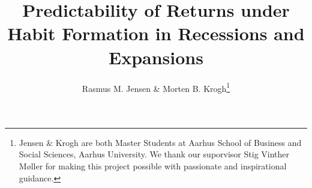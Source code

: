 

\usepackage{booktabs}



\onehalfspacing      %

\author{Rasmus M. Jensen \& Morten B. Krogh\thanks{\rm Jensen \& Krogh are both Master Students at Aarhus School of Business and Social Sciences, Aarhus University. We thank our suporvisor Stig Vinther Møller for making this project possible with passionate and inspirational guidance.}}

\title{\Large \bf Predictability of Returns under Habit Formation in Recessions and Expansions}

\date{}              %


\maketitle
\thispagestyle{empty}



\clearpage


% 




\clearpage

\appendix



\clearpage


\begin{doublespacing}   %


\end{doublespacing}



\clearpage

\renewcommand{\enotesize}{\normalsize}



